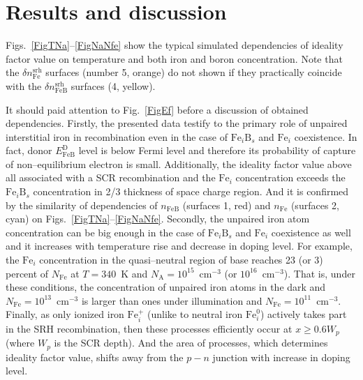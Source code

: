 \documentclass[12pt]{article}
\begin{document}


\section{Results and discussion}

Figs.~\ref{FigTNa}--\ref{FigNaNfe} show the typical simulated dependencies of ideality factor value on temperature and both iron and boron concentration.
Note that the $\delta n_\mathrm{Fe}^\mathrm{srh}$ surfaces (number 5, orange) do not shown if they practically coincide with
the $\delta n_\mathrm{FeB}^\mathrm{srh}$ surfaces (4, yellow).

It should paid attention to Fig.~\ref{FigEf} before a discussion of obtained dependencies.
Firstly, the presented data testify to the primary role of unpaired interstitial iron in recombination
even in the case of $\mathrm{Fe}_i\mathrm{B}_s$ and $\mathrm{Fe}_i$ coexistence.
In fact, donor $E_{\mathrm{FeB}}^\mathrm{D}$ level is below Fermi level
and therefore its probability of capture of non--equilibrium electron is small.
Additionally, the ideality factor value above all associated with a SCR recombination
and the $\mathrm{Fe}_i$ concentration exceeds the $\mathrm{Fe}_i\mathrm{B}_s$ concentration in 2/3 thickness of space charge region.
And it is confirmed by the similarity of dependencies of $n_\mathrm{FeB}$ (surfaces 1, red) and $n_\mathrm{Fe}$ (surfaces 2, cyan)
on Figs.~\ref{FigTNa}--\ref{FigNaNfe}.
Secondly, the unpaired iron atom concentration can be big enough in the case of $\mathrm{Fe}_i\mathrm{B}_s$ and $\mathrm{Fe}_i$ coexistence as well
and it increases with temperature rise and decrease in doping level.
For example, the $\mathrm{Fe}_i$ concentration in the quasi--neutral region of base
reaches 23 (or 3) percent of $N_\mathrm{Fe}$ at $T=340$~K and $N_\mathrm{A}=10^{15}$~cm$^{-3}$ (or $10^{16}$~cm$^{-3}$).
That is, under these conditions, the concentration of unpaired iron atoms in the dark and $N_\mathrm{Fe}=10^{13}$~cm$^{-3}$ is larger
than ones under illumination and $N_\mathrm{Fe}=10^{11}$~cm$^{-3}$.
Finally,
as only ionized iron $\mathrm{Fe}_i^+$ (unlike to neutral iron $\mathrm{Fe}_i^0$) actively takes  part in the SRH recombination,
then these processes efficiently occur at $x\geq0.6W_p$ (where $W_p$ is the SCR depth).
And the area of processes, which determines ideality factor value,
shifts away from the $p-n$ junction with increase in doping level.
\end{document}
